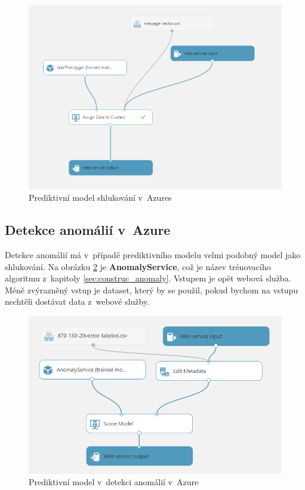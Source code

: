 \documentclass[thesis=M,czech]{FITthesis}[2012/10/20]
\newcommand{\tmpframe}[1]{\fbox{#1}}
\renewcommand{\tmpframe}[1]{#1}
\begin{document}
		\begin{figure}[htb]\centering
			\tmpframe{\includegraphics[width=\textwidth]{./img/azureK-meansPredict}}	
			\caption{Prediktivní model shlukování v~Azures}
			\label{fig:predict_clustering_azure}
		\end{figure}
		
		\subsection{Detekce anomálií v~Azure}
			Detekce anomálií má v~případě prediktivního modelu velmi podobný model jako shlukování. Na obrázku \ref{fig:predict_anomaly_azure} je \textbf{AnomalyService}, což je název trénovacího algoritmu z~kapitoly \ref{sec:construc_anomaly}. Vstupem je opět webová služba. Méně zvýrazněný vstup je dataset, který by se použil, pokud bychom na vstupu nechtěli dostávat data z~webové služby.
			 
		\begin{figure}[htb]\centering
			\includegraphics[width=\textwidth]{./img/azureAnomalyPredict}
			\caption{Prediktivní model v~detekci anomálií v~Azure}
			\label{fig:predict_anomaly_azure}
		\end{figure}
	
\end{document}
